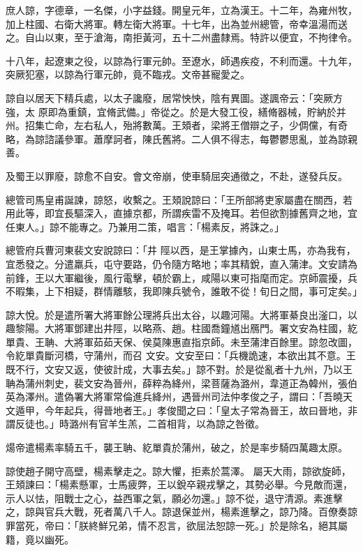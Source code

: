 \begin{pinyinscope}
 庶人諒，字德章，一名傑，小字益錢。開皇元年，立為漢王。十二年，為雍州牧，加上柱國、右衛大將軍。轉左衛大將軍。十七年，出為並州總管，帝幸溫湯而送之。自山以東，至于滄海，南拒黃河，五十二州盡隸焉。特許以便宜，不拘律令。



 十八年，起遼東之役，以諒為行軍元帥。至遼水，師遇疾疫，不利而還。十九年，突厥犯塞，以諒為行軍元帥，竟不臨戎。文帝甚寵愛之。



 諒自以居天下精兵處，以太子讒廢，居常怏怏，陰有異圖。遂諷帝云：「突厥方強，太
 原即為重鎮，宜脩武備。」帝從之。於是大發工役，繕脩器械，貯納於并州。招集亡命，左右私人，殆將數萬。王頍者，梁將王僧辯之子，少倜儻，有奇略，為諒諮議參軍。蕭摩訶者，陳氏舊將。二人俱不得志，每鬱鬱思亂，並為諒親善。



 及蜀王以罪廢，諒愈不自安。會文帝崩，使車騎屈突通徵之，不赴，遂發兵反。



 總管司馬皇甫誕諫，諒怒，收繫之。王頍說諒曰：「王所部將吏家屬盡在關西，若用此等，即宜長驅深入，直據京都，所謂疾雷不及掩耳。若但欲割據舊齊之地，宜任東人。」諒不能專之。乃兼用二策，唱言：「楊素反，將誅之。」



 總管府兵曹河東裴文安說諒曰：「井
 陘以西，是王掌據內，山東士馬，亦為我有，宜悉發之。分遣羸兵，屯守要路，仍令隨方略地；率其精銳，直入蒲津。文安請為前鋒，王以大軍繼後，風行電擊，頓於霸上，咸陽以東可指麾而定。京師震擾，兵不暇集，上下相疑，群情離駭，我即陳兵號令，誰敢不從！旬日之間，事可定矣。」



 諒大悅。於是遣所署大將軍餘公理將兵出太谷，以趣河陽。大將軍綦良出滏口，以趣黎陽。大將軍鄧建出井陘，以略燕、趙。柱國喬鐘馗出鴈門。署文安為柱國，紇單貴、王聃、大將軍茹茹天保、侯莫陳惠直指京師。未至蒲津百餘里。諒忽改圖，令紇單貴斷河橋，守蒲州，而召
 文安。文安至曰：「兵機詭速，本欲出其不意。王既不行，文安又返，使彼計成，大事去矣。」諒不對。於是從亂者十九州，乃以王聃為蒲州刺史，裴文安為晉州，薛粹為絳州，梁菩薩為潞州，韋道正為韓州，張伯英為澤州。遣偽署大將軍常倫進兵絳州，遇晉州司法仲孝俊之子，謂曰：「吾曉天文遁甲，今年起兵，得晉地者王。」孝俊聞之曰：「皇太子常為晉王，故曰晉地，非謂反徒也。」時潞州有官羊生羔，二首相背，以為諒之咎徵。



 煬帝遣楊素率騎五千，襲王聃、紇單貴於蒲州，破之，於是率步騎四萬趣太原。



 諒使趙子開守高壁，楊素擊走之。諒大懼，拒素於蒿澤。
 屬天大雨，諒欲旋師，王頍諫曰：「楊素懸軍，士馬疲弊，王以銳卒親戎擊之，其勢必舉。今見敵而還，示人以怯，阻戰士之心，益西軍之氣，願必勿還。」諒不從，退守清源。素進擊之，諒與官兵大戰，死者萬八千人。諒退保並州，楊素進擊之，諒乃降。百僚奏諒罪當死，帝曰：「朕終鮮兄弟，情不忍言，欲屈法恕諒一死。」於是除名，絕其屬籍，竟以幽死。




\end{pinyinscope}
